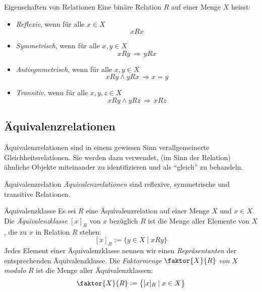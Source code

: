 \begin{definition}{Eigenschaften von Relationen}
    Eine binäre Relation $R$ auf einer Menge $X$ heisst:
    \begin{itemize}
    \item \textit{Reflexiv}, wenn für alle $x\in X$
    \[
    xRx
    \]
    
    \item \textit{Symmetrisch}, wenn für alle $x,y\in X$
    \[
    xRy\,\Rightarrow\, yRx
    \]
    
    \item \textit{Antisymmetrisch}, wenn für alle $x,y\in X$
    \[
    xRy\land yRx\,\Rightarrow x=y
    \]
    
    \item \textit{Transitiv}, wenn für alle $x,y,z\in X$
    \[
    xRy\land yRz\,\Rightarrow \, xRz
    \]
    
    \end{itemize}
    \end{definition}




    \subsection*{Äquivalenzrelationen}

    Äquivalenzrelationen sind in einem gewissen Sinn verallgemeinerte Gleichheitsrelationen. Sie werden dazu verwendet, (im Sinn der Relation) ähnliche Objekte miteinander zu identifizieren und als ``gleich'' zu behandeln.

    \begin{definition}{Äquivalenzrelation}
    \textit{Äquivalenzrelationen} sind reflexive, symmetrische und transitive Relationen.
    \end{definition}


    \begin{definition}{Äquivalenzklasse}
    Es sei $R$ eine Äquivalenzrelation auf einer Menge $X$ und $x\in X$. Die \textit{Äquivalenzklasse} $[x]_R$ von $x$ bezüglich $R$ ist die Menge aller Elemente von $X$, die zu $x$ in Relation $R$ stehen:
    \[
    [x]_R:=\{y\in X\mid xRy \}
    \]
    Jedes Element einer Äquivalenzklasse nennen wir einen \textit{Repräsentanten} der entsprechenden Äquivalenzklasse. Die \textit{Faktormenge} $\faktor{X}{R}$ \textit{von} $X$ \textit{modulo} $R$ ist die Menge aller Äquivalenzklassen:
    \[
    \faktor{X}{R}:=\big\{ [x]_R\mid x\in X \big\}
    \]
    \end{definition}

